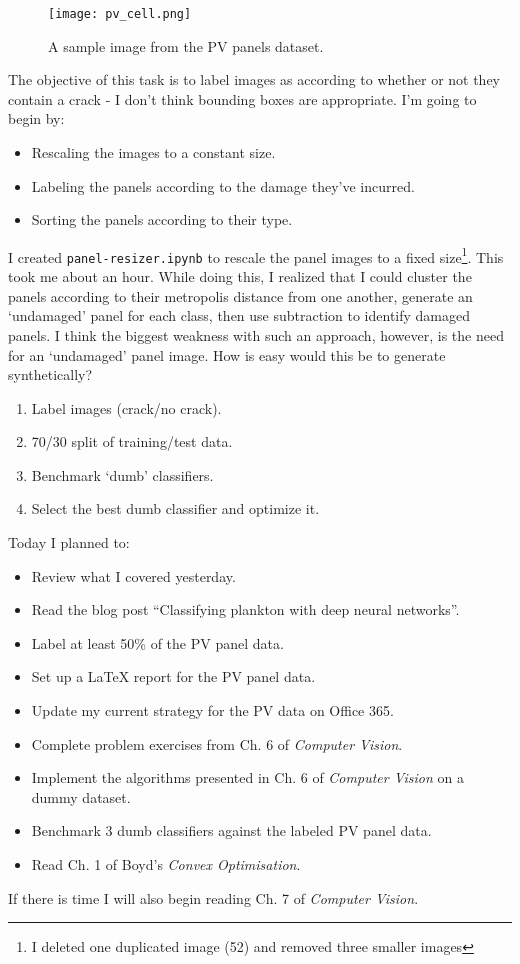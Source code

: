 \documentclass[idxtotoc,hyperref,openany]{labbook} %
\begin{document}
\begin{figure}
\centering
\texttt{[image: pv\_cell.png]}
\caption{A sample image from the PV panels dataset.}
\label{fig:example_pv_cell}
\end{figure}

The objective of this task is to label images as according to whether or not they contain a crack - I don't think bounding boxes are appropriate. I'm going to begin by:
\begin{itemize}
	\item Rescaling the images to a constant size.
	\item Labeling the panels according to the damage they've incurred.
	\item Sorting the panels according to their type.
\end{itemize}

I created \texttt{panel-resizer.ipynb} to rescale the panel images to a fixed size\footnote{I deleted one duplicated image (52) and removed three smaller images}. This took me about an hour. While doing this, I realized that I could cluster the panels according to their metropolis distance from one another, generate an `undamaged' panel for each class, then use subtraction to identify damaged panels. I think the biggest weakness with such an approach, however, is the need for an `undamaged' panel image. How is easy would this be to generate synthetically?
\begin{enumerate}
	\item Label images (crack/no crack).
	\item 70/30 split of training/test data.
	\item Benchmark `dumb' classifiers.
	\item Select the best dumb classifier and optimize it.
\end{enumerate}


Today I planned to:
\begin{itemize}
	\item Review what I covered yesterday.
	\item Read the blog post ``Classifying plankton with deep neural networks''.
	\item Label at least 50\% of the PV panel data.
	\item Set up a LaTeX report for the PV panel data.
	\item Update my current strategy for the PV data on Office 365.
	\item Complete problem exercises from Ch. 6 of \emph{Computer Vision}.
	\item Implement the algorithms presented in Ch. 6 of \emph{Computer Vision} on a dummy dataset.
	\item Benchmark 3 dumb classifiers against the labeled PV panel data.
	\item Read Ch. 1 of Boyd's \emph{Convex Optimisation}.
\end{itemize}
If there is time I will also begin reading Ch. 7 of \emph{Computer Vision}.
\end{document}
